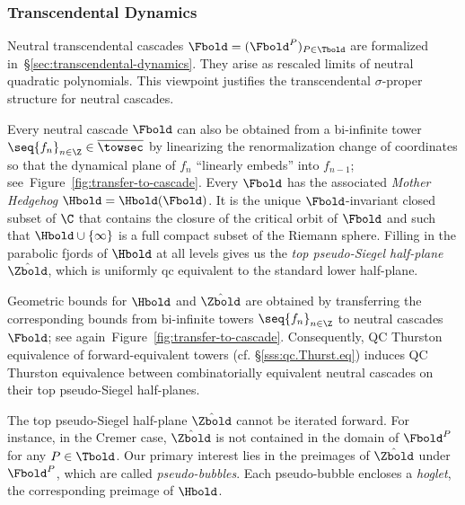 \documentclass{amsart}
\begin{document}
\subsubsection{Transcendental Dynamics}\label{sss:TD.outline} Neutral transcendental cascades $\Fbold = (\Fbold^P)_{P \in \Tbold}$ are formalized in~\S\ref{sec:transcendental-dynamics}. They arise as rescaled limits of neutral quadratic polynomials. This viewpoint justifies the transcendental $\sigma$-proper structure for neutral cascades. 

Every neutral cascade $\Fbold $ can also be obtained from a bi-infinite tower
$\seq{f_n}_{n\in \Z} \in \overline{\towsec}$ by linearizing the renormalization change of coordinates so that the dynamical plane of $f_n$ ``linearly embeds'' into $f_{n-1}$; see~Figure~\ref{fig:transfer-to-cascade}. Every $\Fbold$ has the associated \emph{Mother Hedgehog} $\Hbold = \Hbold(\Fbold)$. It is the unique $\Fbold$-invariant closed subset of $\C$ that contains the closure of the critical orbit of $\Fbold$ and such that $\Hbold \cup \{\infty\}$ is a full compact subset of the Riemann sphere. 
Filling in the parabolic fjords of $\Hbold$ at all levels gives us the \emph{top pseudo-Siegel half-plane} $\hat{\Zbold}$, which is uniformly qc equivalent to the standard lower half-plane. 


Geometric bounds for $\Hbold$ and $\hat{\Zbold}$ are obtained by transferring the corresponding bounds from bi-infinite towers $\seq{f_n}_{n\in \Z}$ to neutral cascades $\Fbold$; see again~Figure~\ref{fig:transfer-to-cascade}. Consequently, QC Thurston equivalence of forward-equivalent towers (cf. \S\ref{sss:qc.Thurst.eq}) induces QC Thurston equivalence between combinatorially equivalent neutral cascades on their top pseudo-Siegel half-planes.

The top pseudo-Siegel half-plane $\hat{\Zbold}$ cannot be iterated forward. For instance, in the Cremer case, $\hat{\Zbold}$ is not contained in the domain of $\Fbold^P$ for any $P \in \Tbold$. Our primary interest lies in the preimages of $\hat{\Zbold}$ under $\Fbold^P$, which are called \emph{pseudo-bubbles}. 
Each pseudo-bubble encloses a \emph{hoglet}, the corresponding preimage of $\Hbold$.
\end{document}
